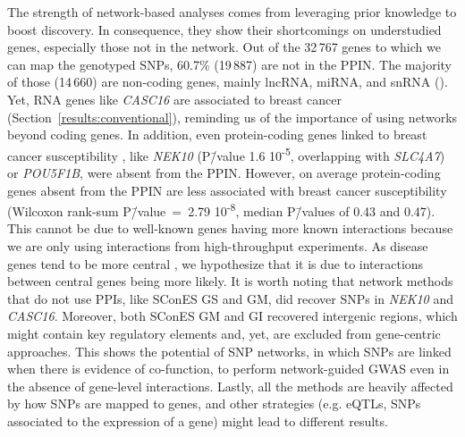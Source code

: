 \documentclass[10pt,letterpaper]{article}
\begin{document}
The strength of network-based analyses comes from leveraging prior knowledge to boost discovery. In consequence, they show their shortcomings on understudied genes, especially those not in the network. Out of the 32\,767 genes to which we can map the genotyped SNPs, 60.7\% (19\,887) are not in the PPIN. The majority of those (14\,660) are non-coding genes, mainly lncRNA, miRNA, and snRNA (). Yet, RNA genes like \emph{CASC16} are associated to breast cancer (Section~\ref{results:conventional}), reminding us of the importance of using networks beyond coding genes. In addition, even protein-coding genes linked to breast cancer susceptibility \cite{ahmed_newly_2009}, like \emph{NEK10} (P\=/value 1.6 \texttimes{} 10\textsuperscript{-5}, overlapping with \emph{SLC4A7}) or \emph{POU5F1B}, were absent from the PPIN. However, on average protein-coding genes absent from the PPIN are less associated with breast cancer susceptibility (Wilcoxon rank-sum P\=/value~=~2.79 \texttimes{} 10\textsuperscript{-8}, median P\=/values of 0.43 and 0.47). This cannot be due to well-known genes having more known interactions because we are only using interactions from high-throughput experiments. As disease genes tend to be more central \cite{pinero_uncovering_2016}, we hypothesize that it is due to interactions between central genes being more likely. It is worth noting that  network methods that do not use PPIs, like SConES GS and GM, did recover SNPs in \emph{NEK10} and \emph{CASC16}. Moreover, both SConES GM and GI recovered intergenic regions, which might contain key regulatory elements \cite{gallagherPostGWASEraAssociation2018} and, yet, are excluded from gene-centric approaches. This shows the potential of SNP networks, in which SNPs are linked when there is evidence of co-function, to perform network-guided GWAS even in the absence of gene-level interactions. Lastly, all the methods are heavily affected by how SNPs are mapped to genes, and other strategies (e.g. eQTLs, SNPs associated to the expression of a gene) might lead to different results. 
\end{document}
